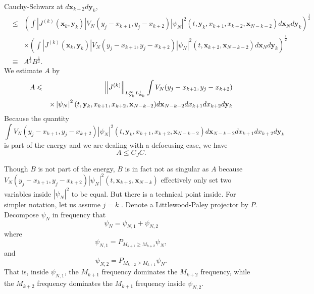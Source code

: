 \documentclass[12pt,letterpaper,leqno]{amsart}
\theoremstyle{plain}
\numberwithin{equation}{section}
\numberwithin{theorem}{section}
\numberwithin{proposition}{section}
\numberwithin{lemma}{section}
\numberwithin{corollary}{section}
\begin{document}
Cauchy-Schwarz at $d\mathbf{x}_{k+2}d\mathbf{y}_{k}$,%
\begin{eqnarray*}
&\leqslant &\left( \int \left\vert J^{(k)}(\mathbf{x}_{k},\mathbf{y}%
_{k})\right\vert V_{N}(y_{j}-x_{k+1},y_{j}-x_{k+2})\left\vert \psi
_{N}\right\vert ^{2}(t,\mathbf{y}_{k},x_{k+1},x_{k+2},\mathbf{x}_{N-k-2})d%
\mathbf{x}_{N}d\mathbf{y}_{k}\right) ^{\frac{1}{2}} \\
&&\times \left( \int \left\vert J^{(k)}(\mathbf{x}_{k},\mathbf{y}%
_{k})\right\vert V_{N}(y_{j}-x_{k+1},y_{j}-x_{k+2})\left\vert \psi
_{N}\right\vert ^{2}(t,\mathbf{x}_{k+2},\mathbf{x}_{N-k-2})d\mathbf{x}_{N}d%
\mathbf{y}_{k}\right) ^{\frac{1}{2}} \\
&\equiv &A^{\frac{1}{2}}B^{\frac{1}{2}}.
\end{eqnarray*}%
We estimate $A$ by%
\begin{eqnarray*}
A &\leqslant &\left\Vert J^{(k)}\right\Vert _{L_{\mathbf{y}_{k}}^{\infty }L_{%
\mathbf{x}_{k}}^{1}}\int V_{N}(y_{j}-x_{k+1},y_{j}-x_{k+2}) \\
&&\times \left\vert \psi _{N}\right\vert ^{2}(t,\mathbf{y}%
_{k},x_{k+1},x_{k+2},\mathbf{x}_{N-k-2})d\mathbf{x}_{N-k-2}dx_{k+1}dx_{k+2}d%
\mathbf{y}_{k}
\end{eqnarray*}%
Because the quantity%
\begin{equation*}
\int V_{N}(y_{j}-x_{k+1},y_{j}-x_{k+2})\left\vert \psi _{N}\right\vert
^{2}(t,\mathbf{y}_{k},x_{k+1},x_{k+2},\mathbf{x}_{N-k-2})d\mathbf{x}%
_{N-k-2}dx_{k+1}dx_{k+2}d\mathbf{y}_{k}
\end{equation*}%
is part of the energy and we are dealing with a defocusing case, we have 
\begin{equation*}
A\leqslant C_{J}C.
\end{equation*}

Though $B$ is not part of the energy, $B$ is in fact not as singular as $A$
because $V_{N}(y_{j}-x_{k+1},y_{j}-x_{k+2})\left\vert \psi _{N}\right\vert
^{2}(t,\mathbf{x}_{k+2},\mathbf{x}_{N-k})$ effectively only set two
variables inside $\left\vert \psi _{N}\right\vert ^{2}$ to be equal. But
there is a technical point inside. For simpler notation, let us assume $j=k$%
. Denote a Littlewood-Paley projector by $P$. Decompose $\psi _{N}$ in
frequency that%
\begin{equation}
\psi _{N}=\psi _{N,1}+\psi _{N,2}
\label{eqn:freq decomposition in compactness}
\end{equation}%
where 
\begin{equation*}
\psi _{N,1}=P_{M_{k+1}\geqslant M_{k+2}}\psi _{N},
\end{equation*}%
and 
\begin{equation*}
\psi _{N,2}=P_{M_{k+2}\geqslant M_{k+1}}\psi _{N}.
\end{equation*}%
That is, inside $\psi _{N,1}$, the $M_{k+1}$ frequency dominates the $%
M_{k+2} $ frequency, while the $M_{k+2}$ frequency dominates the $M_{k+1}$
frequency inside $\psi _{N,2}$.
\end{document}
